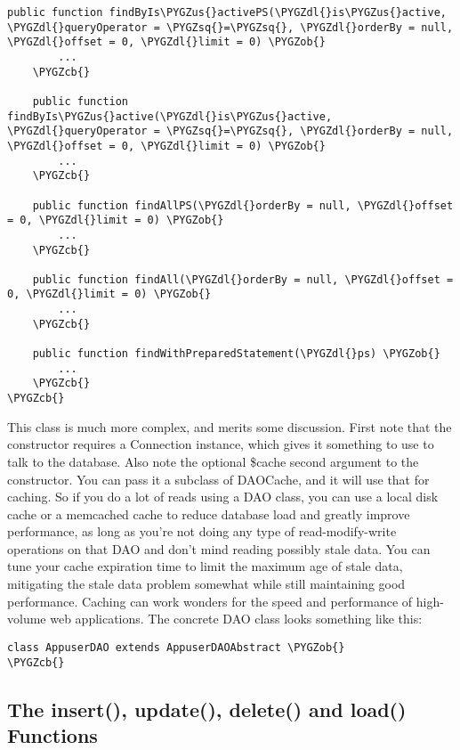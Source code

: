 \documentclass[letterpaper,10pt,english]{sphinxmanual}
\def\PYGZus{\char`\_}
\def\PYGZob{\char`\{}
\def\PYGZcb{\char`\}}
\def\PYGZdl{\char`\$}
\def\PYGZsq{\char`\'}
\renewcommand\PYGZsq{\textquotesingle}
\begin{document}
\begin{Verbatim}[commandchars=\\\{\}]
    public function findByIs\PYGZus{}activePS(\PYGZdl{}is\PYGZus{}active, \PYGZdl{}queryOperator = \PYGZsq{}=\PYGZsq{}, \PYGZdl{}orderBy = null, \PYGZdl{}offset = 0, \PYGZdl{}limit = 0) \PYGZob{}
        ...
    \PYGZcb{}

    public function findByIs\PYGZus{}active(\PYGZdl{}is\PYGZus{}active, \PYGZdl{}queryOperator = \PYGZsq{}=\PYGZsq{}, \PYGZdl{}orderBy = null, \PYGZdl{}offset = 0, \PYGZdl{}limit = 0) \PYGZob{}
        ...
    \PYGZcb{}

    public function findAllPS(\PYGZdl{}orderBy = null, \PYGZdl{}offset = 0, \PYGZdl{}limit = 0) \PYGZob{}
        ...
    \PYGZcb{}

    public function findAll(\PYGZdl{}orderBy = null, \PYGZdl{}offset = 0, \PYGZdl{}limit = 0) \PYGZob{}
        ...
    \PYGZcb{}

    public function findWithPreparedStatement(\PYGZdl{}ps) \PYGZob{}
        ...
    \PYGZcb{}
\PYGZcb{}
\end{Verbatim}

This class is much more complex, and merits some discussion.  First note that the constructor
requires a Connection instance, which gives it something to use to talk to the database.  Also note
the optional \$cache second argument to the constructor.  You can pass it a subclass of DAOCache, and
it will use that for caching.  So if you do a lot of reads using a DAO class, you can use a local
disk cache or a memcached cache to reduce database load and greatly improve performance, as long as
you're not doing any type of read-modify-write operations on that DAO and don't mind reading
possibly stale data.  You can tune your cache expiration time to limit the maximum age of stale
data, mitigating the stale data problem somewhat while still maintaining good performance.  Caching
can work wonders for the speed and performance of high-volume web applications.  The concrete DAO
class looks something like this:

\begin{Verbatim}[commandchars=\\\{\}]
class AppuserDAO extends AppuserDAOAbstract \PYGZob{}
\PYGZcb{}
\end{Verbatim}


\subsection{The insert(), update(), delete() and load() Functions}
\label{jaxFrameworkGuide:the-insert-update-delete-and-load-functions}
\end{document}
